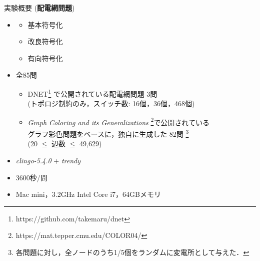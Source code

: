 \documentclass[dvipdfmx,11pt]{beamer}
\begin{document}
\begin{frame}{実験概要 (\textbf{配電網問題})}
  \renewcommand{\thefootnote}{\fnsymbol{footnote}}
  \setcounter{footnote}{1}
  \begin{itemize}
  \item {}
    \begin{itemize}
     \item 基本符号化
     \item 改良符号化
     \item 有向符号化
    \end{itemize}
  \item {} 全85問
    \begin{itemize}
    \item DNET\footnote{https://github.com/takemaru/dnet}%
      で公開されている配電網問題 3問 \\ (トポロジ制約のみ，スイッチ数:
      16個，36個，468個)
    \item \textit{Graph Coloring and its Generalizations}
      \footnote{https://mat.tepper.cmu.edu/COLOR04/}で公開されている \\
      グラフ彩色問題をベースに，独自に生成した 82問 
      \footnote{各問題に対し，全ノードのうち1/5個をランダムに変電所として与えた．}\\
      (20 $\leq$ 辺数 $\leq$ 49,629)
    \end{itemize}
  \item {} \textit{clingo-5.4.0} $+$ \textit{trendy}
  \item {} 3600秒/問
  \item {} Mac mini，3.2GHz Intel Core i7，64GBメモリ
  \end{itemize}
\end{frame}
\end{document}
